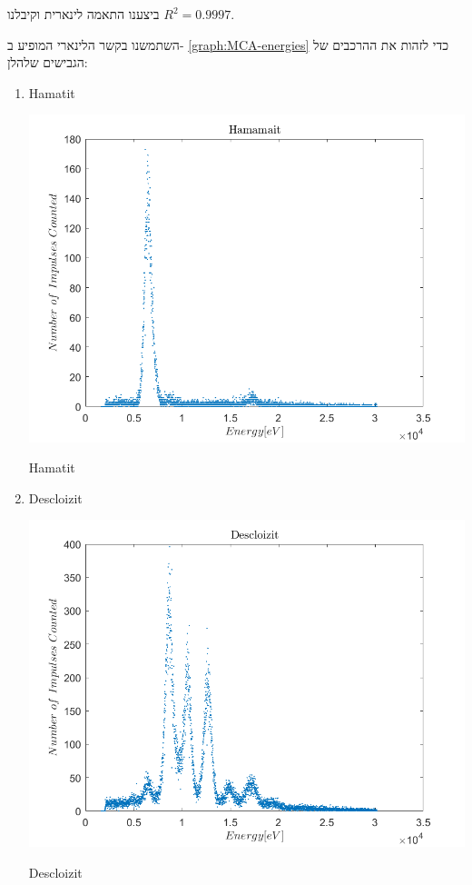 \documentclass{article}
\begin{document}
ביצענו התאמה לינארית וקיבלנו
$R^2 = 0.9997$.

השתמשנו בקשר הלינארי המופיע ב-
\ref{graph:MCA-energies}
כדי לזהות את ההרכבים של הגבישים שלהלן:
\begin{enumerate}
    \item Hamatit
    \begin{graph}[ht!]
    \centering
    \includegraphics[width=\textwidth]{Hamamit.png}
    \caption{
    \textenglish{Hamatit}
    }
    \label{graph:Hamatit-spec}
    \end{graph}
    \item Descloizit
    \begin{graph}[ht!]
    \centering
    \includegraphics[width=\textwidth]{Descloizit.png}
    \caption{
    \textenglish{Descloizit}
    }
    \label{graph:Descloizit-spec}
    \end{graph}
\end{enumerate}
\end{document}
